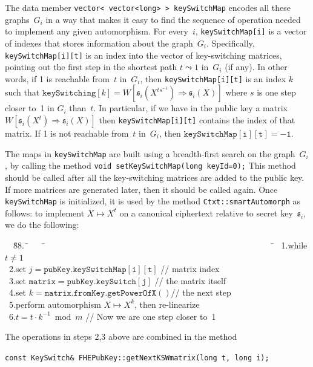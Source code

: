\documentclass[14pt]{extarticle}
\newcommand{\sk}{\mathfrak{s}}
\begin{document}
The data member \texttt{vector< vector<long> > keySwitchMap} encodes
all these graphs~$G_i$ in a way that makes it easy to find the
sequence of operation needed to implement any given automorphism.
For every~$i$, \texttt{keySwitchMap[i]} is a vector of indexes that
stores information about the graph~$G_i$. Specifically,
\texttt{keySwitchMap[i][t]} is an index into the vector of
key-switching matrices, pointing out the first step in the shortest
path $t\leadsto 1$ in~$G_i$ (if any). In other words, if 1 is
reachable from~$t$ in~$G_i$, then \texttt{keySwitchMap[i][t]} is an
index $k$ such that $\mathtt{keySwitching}[k]=W[\sk_i(X^{ts^{-1}})
\Rightarrow\sk_i(X)]$ where $s$ is one step closer to~1 in $G_i$
than~$t$. In particular, if we have in the public key a matrix
$W[\sk_i(X^t)\Rightarrow\sk_i(X)]$ then \texttt{keySwitchMap[i][t]}
contains the index of that matrix. If 1 is not reachable from~$t$
in~$G_i$, then $\mathtt{keySwitchMap[i][t]=-1}$. 

The maps in \texttt{keySwitchMap} are built using a breadth-first
search on the graph~$G_i$, by calling the method \texttt{void
setKeySwitchMap(long keyId=0);} This method should be called after
all the key-switching matrices are added to the public key. If more
matrices are generated later, then it should be called again.
Once \texttt{keySwitchMap} is initialized, it is used by the method
\texttt{Ctxt::smartAutomorph} as follows: to implement $X\mapsto X^t$
on a canonical ciphertext relative to secret key~$\sk_i$, we do the
following:

\begin{tabbing}
~~\=88.~\=~~~~\=~~~~~~~~~~~~~~~~~~~~~~~~~~~~~~~~~~~~~~~~~~~~~~~~~~~~~~\=\kill
\>~1.\>while $t \ne 1$\\
\>~2.\>\>set $j =\mathtt{pubKey.keySwitchMap[i][t]}$ \>// matrix index \\
\>~3.\>\>set $\mathtt{matrix = pubKey.keySwitch[j]}$ \>// the matrix itself\\
\>~4.\>\>set $k = \mathtt{matrix.fromKey.getPowerOfX()}$\>// the next step\\
\>~5.\>\>perform automorphism $X\mapsto X^k$, then re-linearize\\
\>~6.\>\>$t = t \cdot k^{-1} \bmod m$ \>// Now we are one step closer to~1
\end{tabbing}

\noindent
The operations in steps 2,3 above are combined in the method

\texttt{const KeySwitch\& FHEPubKey::getNextKSWmatrix(long t, long i);}
\end{document}
